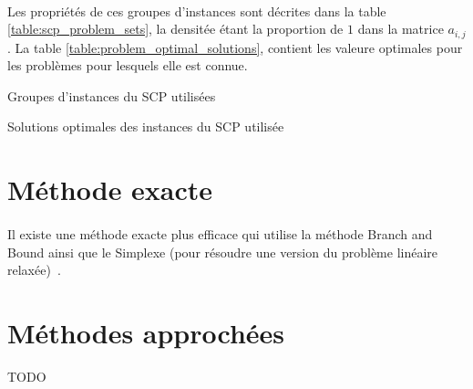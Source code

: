 \documentclass[12pt,letterpaper,twoside]{article}
\begin{document}
		\paragraph*{}
		   Les propriétés de ces groupes d'instances sont décrites dans la table \ref{table:scp_problem_sets}, la densitée étant la proportion de \(1\) dans la matrice \(a_{i,j}\). La table \ref{table:problem_optimal_solutions}, contient les valeure optimales pour les problèmes pour lesquels elle est connue.
		\begin{table}[H]
			\centering
			
			\caption{Groupes d'instances du SCP utilisées\cite{OR-Library,Balas1980,Beasley1987,Beasley1990}}
			\label{table:scp_problem_sets}
		\end{table}
		\begin{table}[H]
			\centering
			\begin{minipage}[t]{0.45\linewidth}
				\centering
				
			\end{minipage}
			\begin{minipage}[t]{0.45\linewidth}
				\centering
				
			\end{minipage}
			\caption{Solutions optimales des instances du SCP utilisée\cite{Beasley1990}}
			\label{table:problem_optimal_solutions}
		\end{table}
	\section{Méthode exacte}
		\paragraph*{}
			Il existe une méthode exacte plus efficace qui utilise la méthode Branch and Bound ainsi que le Simplexe (pour résoudre une version
			du problème linéaire relaxée)~\cite{caprara2000algorithms}.
	\section{Méthodes approchées}
		TODO
	\newpage\printbibliography[heading=bibintoc]{}
\end{document}
